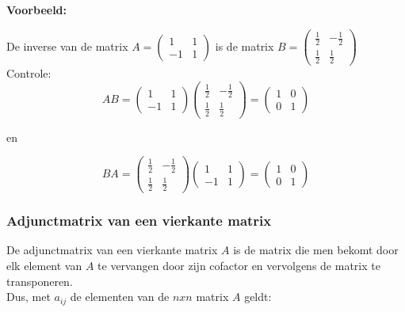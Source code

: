 {\bf Voorbeeld:}

De inverse van de matrix $A=\left( \begin{matrix} 1 & 1 \\ -1 & 1 \end{matrix} \right)$ is de matrix $B=\left( \begin{matrix} \frac{1}{2} & -\frac{1}{2} \\ \frac{1}{2} & \frac{1}{2} \end{matrix} \right)$ \\
Controle:\\
\[ AB=\left( \begin{matrix} 1 & 1 \\ -1 & 1 \end{matrix} \right) \left( \begin{matrix} \frac{1}{2} & -\frac{1}{2} \\ \frac{1}{2} & \frac{1}{2} \end{matrix} \right)= \left( \begin{matrix} 1 & 0 \\ 0 & 1 \end{matrix} \right)    \]

en

\[ BA=\left( \begin{matrix} \frac{1}{2} & -\frac{1}{2} \\ \frac{1}{2} & \frac{1}{2} \end{matrix} \right) \left( \begin{matrix} 1 & 1 \\ -1 & 1 \end{matrix} \right) =  \left( \begin{matrix} 1 & 0 \\ 0 & 1 \end{matrix} \right)    \]

\subsubsection{Adjunctmatrix van een vierkante matrix}

De adjunctmatrix van een vierkante matrix $A$ is de matrix die men bekomt door elk element van $A$ te vervangen door zijn cofactor en vervolgens de matrix te transponeren.\\

Dus, met $a_{ij}$ de elementen van de $nxn$ matrix $A$ geldt:

